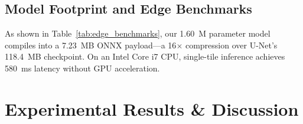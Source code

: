 \documentclass[conference]{IEEEtran}
\begin{document}
\subsection{Model Footprint and Edge Benchmarks}
As shown in Table~\ref{tab:edge_benchmarks}, our 1.60~M parameter model compiles into a 7.23~MB ONNX payload—a 16$\times$ compression over U-Net's 118.4~MB checkpoint. On an Intel Core i7 CPU, single-tile inference achieves 580~ms latency without GPU acceleration.

\begin{table}[t]
\centering
\caption{Edge Model Footprint, Storage, and Inference Latency Benchmarks (Input: $1\times3\times256\times256$)}
\label{tab:edge_benchmarks}
\end{table}

\section{Experimental Results \& Discussion}
\label{sec:experiments}
\end{document}
